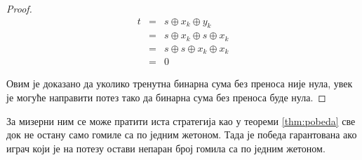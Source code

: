 \documentclass[a4paper]{article}
\begin{document}
\begin{proof}
	 \begin{eqnarray*}
	 	t &=& s \oplus x_{k} \oplus y_{k} \\ 
	 	&=& s \oplus x_{k} \oplus s \oplus x_{k} \\
	 	&=& s \oplus s \oplus x_{k} \oplus x_{k} \\
	 	&=& 0		 
	 \end{eqnarray*}
	 
	 Овим је доказано да уколико тренутна бинарна сума без преноса није нула, увек је могуће направити потез тако да бинарна сума без преноса буде нула.
	 
\end{proof}

За мизерни ним се може пратити иста стратегија као у теореми \ref{thm:pobeda} све док не остану само гомиле са по једним жетоном. Тада је победа гарантована ако играч који је на потезу остави непаран број гомила са по једним жетоном.
\end{document}
